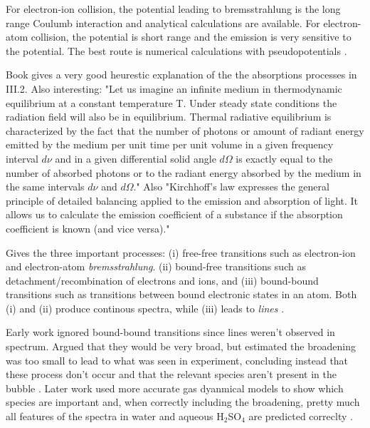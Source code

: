 \documentclass[rmp,aps,nofootinbib,superscriptaddress,floatfix]{revtex4-2}
\begin{document}
For electron-ion collision, the potential leading to bremsstrahlung is the long range Coulumb interaction and analytical calculations are available. For electron-atom collision, the potential is short range and the emission is very sensitive to the potential. The best route is numerical calculations with pseudopotentials \cite{geltman1973free}.

Book \cite{zel2002physics} gives a very good heurestic explanation of the the absorptions processes in III.2. Also interesting: "Let us imagine an infinite medium in thermodynamic equilibrium at a constant temperature T. Under steady state conditions the radiation field will also be in equilibrium. Thermal radiative equilibrium is characterized by the fact that the number of photons or amount of radiant energy emitted by the medium per unit time per unit volume in a given frequency interval $d\nu$ and in a given differential solid angle $d\Omega$ is exactly equal to the number of absorbed photons or to the radiant energy absorbed by the medium in the same intervals $d\nu$ and $d\Omega$." Also "Kirchhoff's law expresses the general principle of detailed balancing applied to the emission and absorption of light. It allows us to calculate the emission coefficient of a substance if the absorption coefficient is known (and vice versa)."

Gives the three important processes: (i) free-free transitions such as electron-ion and electron-atom \emph{bremsstrahlung}. (ii) bound-free transitions such as detachment/recombination of electrons and ions, and (iii) bound-bound transitions such as transitions between bound electronic states in an atom. Both (i) and (ii) produce continous spectra, while (iii) leads to \emph{lines} \cite{zel2002physics}.


Early work ignored bound-bound transitions since lines weren't observed in spectrum. Argued that they would be very broad, but estimated the broadening was too small to lead to what was seen in experiment, concluding instead that these process don't occur and that the relevant species aren't present in the bubble \cite{hilgenfeldt1999simple,hilgenfeldt1999sonoluminescence}. Later work used more accurate gas dyanmical models to show which species are important \cite{an2006mechanism,an2008spectral,an2006mechanism} and, when correctly including the broadening, pretty much all features of the spectra in water and aqueous H$_2$SO$_4$ are predicted correclty \cite{suslick2008inside,flannigan2006measurement,flannigan2005plasma}.
\end{document}
